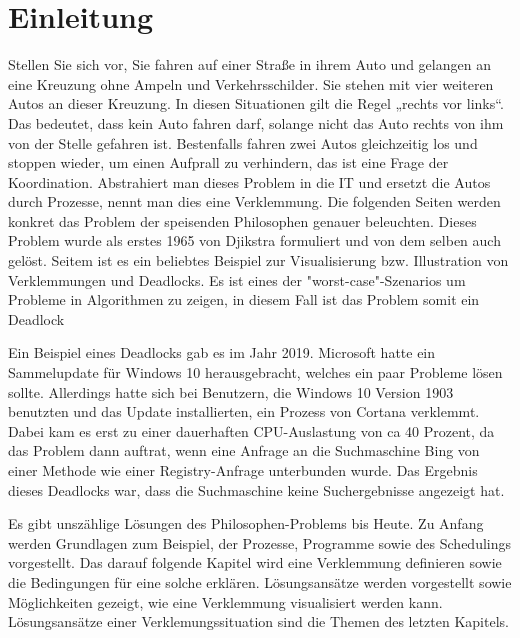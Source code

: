\chapter{Einleitung}
\label{sec:Einleitung}
Stellen Sie sich vor, Sie fahren auf einer Straße in ihrem Auto und gelangen an eine Kreuzung ohne Ampeln und Verkehrsschilder. Sie stehen mit vier weiteren Autos an dieser Kreuzung. In diesen Situationen gilt die Regel „rechts vor links“. Das bedeutet, dass kein Auto fahren darf, solange nicht das Auto rechts von ihm von der Stelle gefahren ist. Bestenfalls fahren zwei Autos gleichzeitig los und stoppen wieder, um einen Aufprall zu verhindern, das ist eine Frage der Koordination.
Abstrahiert man dieses Problem in die IT und ersetzt die Autos durch Prozesse, nennt man dies eine Verklemmung.
Die folgenden Seiten werden konkret das Problem der speisenden Philosophen genauer beleuchten.
Dieses Problem wurde als erstes 1965 von Djikstra formuliert und von dem selben auch gelöst. Seitem ist es ein beliebtes Beispiel zur Visualisierung bzw. Illustration von Verklemmungen und Deadlocks. Es ist eines der "worst-case"-Szenarios um Probleme in Algorithmen zu zeigen, in diesem Fall ist das Problem somit ein Deadlock

Ein Beispiel eines Deadlocks gab es im Jahr 2019. Microsoft hatte ein Sammelupdate für Windows 10 herausgebracht, welches ein paar Probleme lösen sollte. Allerdings hatte sich bei Benutzern, die Windows 10 Version 1903 benutzten und das Update installierten, ein Prozess von Cortana verklemmt. Dabei kam es erst zu einer dauerhaften CPU-Auslastung von  ca 40 Prozent, da das Problem dann auftrat, wenn eine Anfrage an die Suchmaschine Bing von einer Methode wie einer Registry-Anfrage unterbunden wurde. Das Ergebnis dieses Deadlocks war, dass die Suchmaschine keine Suchergebnisse angezeigt hat.\parencite[vgl.][]{bug}

Es gibt unszählige Lösungen des Philosophen-Problems bis Heute. 
Zu Anfang werden Grundlagen zum Beispiel, der Prozesse, Programme sowie des Schedulings vorgestellt. Das darauf folgende Kapitel wird eine Verklemmung definieren sowie die Bedingungen für eine solche erklären. 
Lösungsansätze werden vorgestellt sowie Möglichkeiten gezeigt, wie eine Verklemmung visualisiert werden kann. Lösungsansätze einer Verklemungssituation sind die Themen des letzten Kapitels.